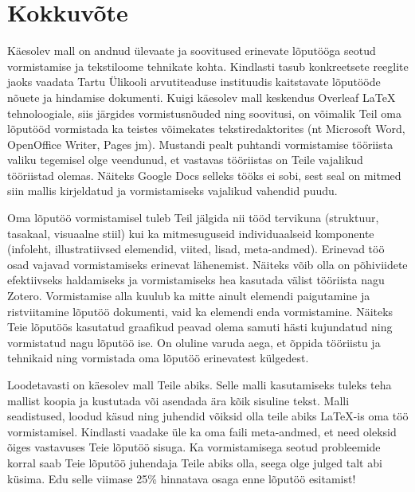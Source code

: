 \section{Kokkuvõte} \label{kokkuvõte}
Käesolev mall on andnud ülevaate ja soovitused erinevate lõputööga seotud vormistamise ja tekstiloome tehnikate kohta. Kindlasti tasub konkreetsete reeglite jaoks vaadata Tartu Ülikooli arvutiteaduse instituudis kaitstavate lõputööde nõuete ja hindamise dokumenti. Kuigi käesolev mall keskendus Overleaf LaTeX tehnoloogiale, siis järgides vormistusnõuded ning soovitusi, on võimalik Teil oma lõputööd vormistada ka teistes võimekates tekstiredaktorites (nt Microsoft Word, OpenOffice Writer, Pages jm). Mustandi pealt puhtandi vormistamise tööriista valiku tegemisel olge veendunud, et vastavas tööriistas on Teile vajalikud tööriistad olemas. Näiteks Google Docs selleks tööks ei sobi, sest seal on mitmed siin mallis kirjeldatud ja vormistamiseks vajalikud vahendid puudu.

Oma lõputöö vormistamisel tuleb Teil jälgida nii tööd tervikuna (struktuur, tasakaal, visuaalne stiil) kui ka mitmesuguseid individuaalseid komponente (infoleht, illustratiivsed elemendid, viited, lisad, meta-andmed). Erinevad töö osad vajavad vormistamiseks erinevat lähenemist. Näiteks võib olla on põhiviidete efektiivseks haldamiseks ja vormistamiseks hea kasutada välist tööriista nagu Zotero. Vormistamise alla kuulub ka mitte ainult elemendi paigutamine ja ristviitamine lõputöö dokumenti, vaid ka elemendi enda vormistamine. Näiteks Teie lõputöös kasutatud graafikud peavad olema samuti hästi kujundatud ning vormistatud nagu lõputöö ise. On oluline varuda aega, et õppida tööriistu ja tehnikaid ning vormistada oma lõputöö erinevatest külgedest.

Loodetavasti on käesolev mall Teile abiks. Selle malli kasutamiseks tuleks teha mallist koopia ja kustutada või asendada ära kõik sisuline tekst. Malli seadistused, loodud käsud ning juhendid võiksid olla teile abiks LaTeX-is oma töö vormistamisel. Kindlasti vaadake üle ka oma faili meta-andmed, et need oleksid õiges vastavuses Teie lõputöö sisuga. Ka vormistamisega seotud probleemide korral saab Teie lõputöö juhendaja Teile abiks olla, seega olge julged talt abi küsima. Edu selle viimase 25\% hinnatava osaga enne lõputöö esitamist!
